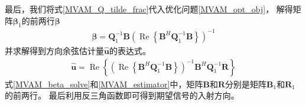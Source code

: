 \documentclass[master]{thesis-uestc}
\begin{document}
最后，我们将式\eqref{MVAM_Q_tilde_frac}代入优化问题\eqref{MVAM_opt_obj}，
解得矩阵$\bm{\beta}_1$的前两行$\bm{\beta}$
\begin{equation}\label{MVAM_beta_solve}
    \begin{aligned}
        \bm{\beta} = \bm{Q}^{-1}_1\bm{B}
        \left(\operatorname{Re}\left\{\bm{B}^H\bm{Q}^{-1}_1\bm{B}\right\}\right)^{-1}
    \end{aligned}
\end{equation}
并求解得到方向余弦估计量$\hat{\bm{u}}$的表达式。
\begin{equation}\label{MVAM_estimator}
    \begin{aligned}
        \hat{\bm{u}} = \operatorname{Re}
        \left\{
            \left(\operatorname{Re}\left\{\bm{B}^H\bm{Q}^{-1}_1\bm{B}\right\}\right)^{-1}
            \bm{B}^H\bm{Q}^{-1}_1\bm{R}
        \right\}
    \end{aligned}
\end{equation}
式\eqref{MVAM_beta_solve}和\eqref{MVAM_estimator}中，矩阵$\bm{B}$和$\bm{R}$分别是矩阵$\bm{B}_1$和$\bm{R}_1$的前两行。
最后利用反三角函数即可得到期望信号的入射方向。

\end{document}
